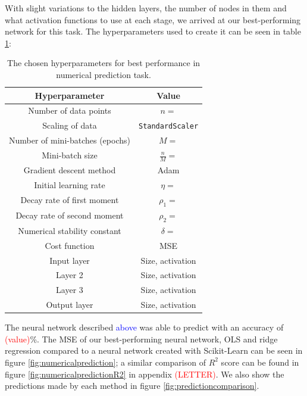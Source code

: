 With slight variations to the hidden layers, the number of nodes in them and what activation functions to use at each stage, we arrived at our best-performing network for this task. The hyperparameters used to create it can be seen in table \ref{tab:numericalprediction}: 
\begin{table}[h!]
  \centering
  \small
  \begin{tabular}{|c|c|}
    \hline
    \textbf{Hyperparameter} & \textbf{Value} \\
    \hline
    Number of data points & $n = $ \\
    \hline
    Scaling of data & \texttt{StandardScaler} \\
    \hline
    Number of mini-batches (epochs) & $M =$ \\
    \hline
    Mini-batch size & $\frac{n}{M} = $ \\
    \hline
    Gradient descent method & Adam \\
    \hline
    Initial learning rate & $\eta = $ \\
    \hline
    Decay rate of first moment & $\rho_1 =$ \\
    \hline
    Decay rate of second moment & $\rho_2 = $ \\
    \hline
    Numerical stability constant & $\delta = $ \\
    \hline
    Cost function & MSE \\
    \hline
    Input layer & Size, activation \\
    \hline
    Layer 2 & Size, activation \\
    \hline
    Layer 3 & Size, activation \\
    \hline
    Output layer & Size, activation \\
    \hline
  \end{tabular}
  \caption{The chosen hyperparameters for best performance in numerical prediction task.}
  \label{tab:numericalprediction}
\end{table}

The neural network described \textcolor{blue}{above} was able to predict with an accuracy of \textcolor{red}{(value)}\%. The MSE of our best-performing neural network, OLS and ridge regression compared to a neural network created with Scikit-Learn can be seen in figure \ref{fig:numericalprediction}; a similar comparison of $R^2$ score can be found in figure \ref{fig:numericalpredictionR2} in appendix \textcolor{red}{(LETTER)}. We also show the predictions made by each method in figure \ref{fig:predictioncomparison}.


